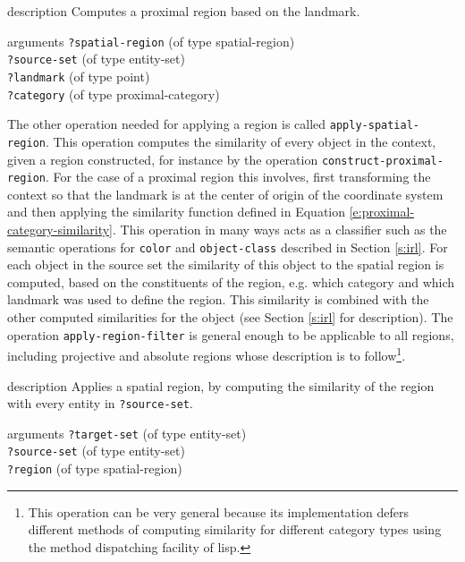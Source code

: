 \begin{explanation}{description}
Computes a proximal region based on the landmark.
\end{explanation}
\begin{explanation}{arguments}
{\footnotesize\verb+?spatial-region+} (of type spatial-region) \\
{\footnotesize\verb+?source-set+} (of type entity-set) \\
{\footnotesize\verb+?landmark+} (of type point)\\
{\footnotesize\verb+?category+} (of type proximal-category)
\vspace{0.3cm}
\end{explanation}

The other operation needed for applying a region is called 
{\footnotesize\tt apply-spatial-region}. This operation computes the similarity of 
every object in the context, given a region constructed, for instance by the 
operation {\footnotesize\tt construct-proximal-region}. For the case of 
a proximal region this involves, first transforming the context so
that the landmark is at the center of origin of the coordinate system
and then applying the similarity function defined in Equation 
\ref{e:proximal-category-similarity}. This operation in many ways
acts as a classifier such as the semantic operations for {\footnotesize\tt color}
and {\footnotesize\tt object-class} described in Section \ref{s:irl}. 
For each object in the source set the similarity of this object to the 
spatial region is computed, based on the constituents of the region,
e.g. which category and which landmark was used to define the region.
This similarity is combined with the other computed similarities for
the object (see Section \ref{s:irl} for description). 
The operation {\footnotesize\tt apply-region-filter} 
is general enough to be applicable to all regions, including projective and absolute 
regions whose description is to follow\footnote{This operation can
be very general because its implementation defers different
methods of computing similarity for different category types
using the method dispatching facility of lisp.}.

\begin{explanation}{description}
Applies a spatial region, by computing the similarity of the region
with every entity in {\footnotesize\verb+?source-set+}.
\end{explanation}
\begin{explanation}{arguments}
{\footnotesize\verb+?target-set+} (of type entity-set) \\
{\footnotesize\verb+?source-set+} (of type entity-set) \\
{\footnotesize\verb+?region+} (of type spatial-region)
\vspace{0.3cm}
\end{explanation}

